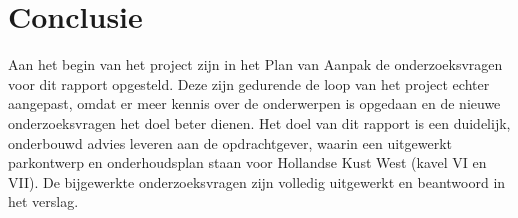 \section{Conclusie}
Aan het begin van het project zijn in het Plan van Aanpak de onderzoeksvragen voor dit rapport opgesteld. Deze zijn gedurende de loop van het project echter aangepast, omdat er meer kennis over de onderwerpen is opgedaan en de nieuwe onderzoeksvragen het doel beter dienen. Het doel van dit rapport is een duidelijk, onderbouwd advies leveren aan de opdrachtgever, waarin een uitgewerkt parkontwerp en onderhoudsplan staan voor Hollandse Kust West (kavel VI en VII). De bijgewerkte onderzoeksvragen zijn volledig uitgewerkt en beantwoord in het verslag. 




